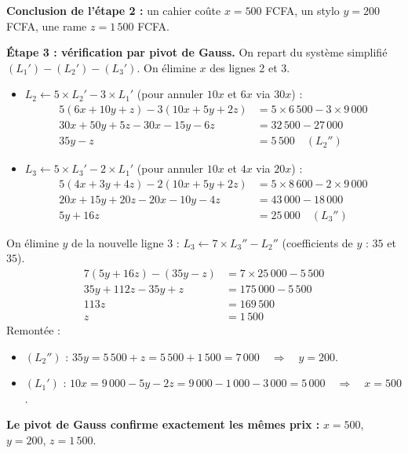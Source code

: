 \documentclass[11pt]{article}
\begin{document}
\begin{exoresolu}
\textbf{Conclusion de l'étape 2 :} un cahier coûte $x = 500$ FCFA, un stylo $y = 200$ FCFA, une rame $z = 1\,500$ FCFA.

\textbf{Étape 3 : vérification par pivot de Gauss.} On repart du système simplifié $(L_1')-(L_2')-(L_3')$. On élimine $x$ des lignes 2 et 3.
\begin{itemize}
\item $L_2 \leftarrow 5 \times L_2' - 3 \times L_1'$ (pour annuler $10x$ et $6x$ via $30x$) :
\begin{align*}
5(6x + 10y + z) - 3(10x + 5y + 2z) &= 5 \times 6\,500 - 3 \times 9\,000 \\
30x + 50y + 5z - 30x - 15y - 6z &= 32\,500 - 27\,000 \\
35y - z &= 5\,500 \quad (L_2'')
\end{align*}
\item $L_3 \leftarrow 5 \times L_3' - 2 \times L_1'$ (pour annuler $10x$ et $4x$ via $20x$) :
\begin{align*}
5(4x + 3y + 4z) - 2(10x + 5y + 2z) &= 5 \times 8\,600 - 2 \times 9\,000 \\
20x + 15y + 20z - 20x - 10y - 4z &= 43\,000 - 18\,000 \\
5y + 16z &= 25\,000 \quad (L_3'')
\end{align*}
\end{itemize}
On élimine $y$ de la nouvelle ligne 3 : $L_3 \leftarrow 7 \times L_3'' - L_2''$ (coefficients de $y$ : $35$ et $35$).
\begin{align*}
7(5y + 16z) - (35y - z) &= 7 \times 25\,000 - 5\,500 \\
35y + 112z - 35y + z &= 175\,000 - 5\,500 \\
113z &= 169\,500 \\
z &= 1\,500
\end{align*}
Remontée :
\begin{itemize}
\item $(L_2'')$ : $35y = 5\,500 + z = 5\,500 + 1\,500 = 7\,000 \quad \Rightarrow \quad y = 200$.
\item $(L_1')$ : $10x = 9\,000 - 5y - 2z = 9\,000 - 1\,000 - 3\,000 = 5\,000 \quad \Rightarrow \quad x = 500$.
\end{itemize}
\textbf{Le pivot de Gauss confirme exactement les mêmes prix :} $x=500$, $y=200$, $z=1\,500$.


\end{exoresolu}
\end{document}
